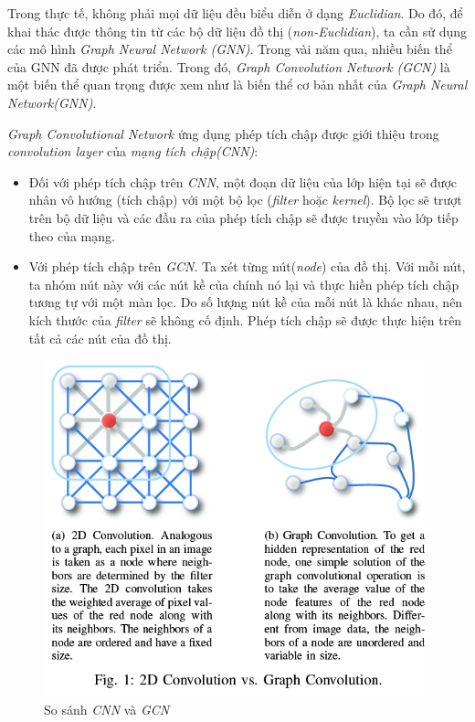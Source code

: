 Trong thực tế, không phải mọi dữ liệu đều biểu diễn ở dạng \textit{Euclidian}. Do đó, để khai thác được thông tin từ các bộ dữ liệu đồ thị (\textit{non-Euclidian}), ta cần sử dụng các mô hình \textit{Graph Neural Network (GNN)}. Trong vài năm qua, nhiều biến thể của GNN đã được phát triển. Trong đó, \textit{Graph Convolution Network (GCN)} là một biến thể quan trọng được xem như là biến thể cơ bản nhất của \textit{Graph Neural Network(GNN)}.

\textit{Graph Convolutional Network} ứng dụng phép tích chập được giới thiệu trong \textit{convolution layer} của \textit{mạng tích chập(CNN)}:
\begin{itemize}
	\item Đối với phép tích chập trên \textit{CNN}, một đoạn dữ liệu của lớp hiện tại sẽ được nhân vô hướng (tích chập) với một bộ lọc (\textit{filter} hoặc \textit{kernel}). Bộ lọc sẽ trượt trên bộ dữ liệu và các đầu ra của phép tích chập sẽ được truyền vào lớp tiếp theo của mạng.
	\item Với phép tích chập trên \textit{GCN}. Ta xét từng nút(\textit{node}) của đồ thị. Với mỗi nút, ta nhóm nút này với các nút kề của chính nó lại và thực hiền phép tích chập tương tự với một màn lọc. Do số lượng nút kề của mỗi nút là khác nhau, nên kích thước của \textit{filter} sẽ không cố định. Phép tích chập sẽ được thực hiện trên tất cả các nút của đồ thị.
\end{itemize}

\begin{figure}[H]
    \begin{center}
        \includegraphics[scale=0.6]{images/cnn-vs-gcn}
        \caption{So sánh \textit{CNN} và \textit{GCN}}
        \label{fig:cnn-vs-gcn}
    \end{center}
\end{figure}

